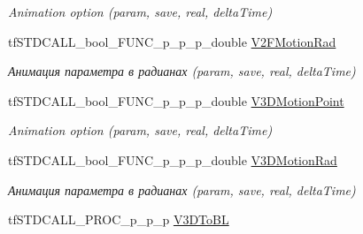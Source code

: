 \begin{DoxyCompactItemize}
\begin{DoxyCompactList}\small\item\em Animation option (param, save, real, delta\-Time) \end{DoxyCompactList}\item 
\hypertarget{structs_functions_extension_c_p_u_a5b8e58cec56be3c2af76fda1b4686c74}{tf\-S\-T\-D\-C\-A\-L\-L\-\_\-bool\-\_\-\-F\-U\-N\-C\-\_\-p\-\_\-p\-\_\-p\-\_\-double \hyperlink{structs_functions_extension_c_p_u_a5b8e58cec56be3c2af76fda1b4686c74}{V2\-F\-Motion\-Rad}}\label{structs_functions_extension_c_p_u_a5b8e58cec56be3c2af76fda1b4686c74}

\begin{DoxyCompactList}\small\item\em Анимация параметра в радианах (param, save, real, delta\-Time) \end{DoxyCompactList}\item 
\hypertarget{structs_functions_extension_c_p_u_aca950c01da34bf5081ab209a55afa03c}{tf\-S\-T\-D\-C\-A\-L\-L\-\_\-bool\-\_\-\-F\-U\-N\-C\-\_\-p\-\_\-p\-\_\-p\-\_\-double \hyperlink{structs_functions_extension_c_p_u_aca950c01da34bf5081ab209a55afa03c}{V3\-D\-Motion\-Point}}\label{structs_functions_extension_c_p_u_aca950c01da34bf5081ab209a55afa03c}

\begin{DoxyCompactList}\small\item\em Animation option (param, save, real, delta\-Time) \end{DoxyCompactList}\item 
\hypertarget{structs_functions_extension_c_p_u_a2df6a218d0f57e4cb24f01caf5d2d480}{tf\-S\-T\-D\-C\-A\-L\-L\-\_\-bool\-\_\-\-F\-U\-N\-C\-\_\-p\-\_\-p\-\_\-p\-\_\-double \hyperlink{structs_functions_extension_c_p_u_a2df6a218d0f57e4cb24f01caf5d2d480}{V3\-D\-Motion\-Rad}}\label{structs_functions_extension_c_p_u_a2df6a218d0f57e4cb24f01caf5d2d480}

\begin{DoxyCompactList}\small\item\em Анимация параметра в радианах (param, save, real, delta\-Time) \end{DoxyCompactList}\item 
\hypertarget{structs_functions_extension_c_p_u_a538e19ecc5c6d99c830df70d20c7be3d}{tf\-S\-T\-D\-C\-A\-L\-L\-\_\-\-P\-R\-O\-C\-\_\-p\-\_\-p\-\_\-p \hyperlink{structs_functions_extension_c_p_u_a538e19ecc5c6d99c830df70d20c7be3d}{V3\-D\-To\-B\-L}}\label{structs_functions_extension_c_p_u_a538e19ecc5c6d99c830df70d20c7be3d}


\end{DoxyCompactItemize}
